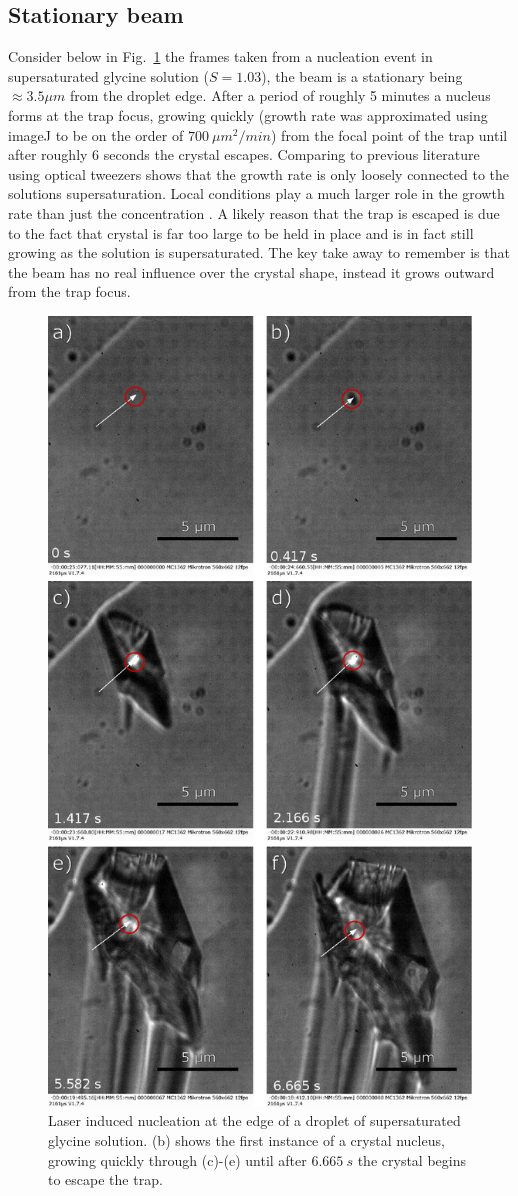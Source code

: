 \subsection{Stationary beam}
Consider below in Fig.~\ref{fig:stationary_beam} the frames taken from a nucleation 
event in supersaturated glycine solution ($S=1.03$), the beam is a stationary being 
$\approx3.5 \mu m$ from the droplet edge. After a period of roughly 5 minutes a 
nucleus forms at the trap focus, growing quickly (growth rate was approximated using
imageJ to be on the order of $700\ \mu m^2/min$) from the focal point of the trap 
until after roughly $6$ seconds the crystal escapes. Comparing to previous literature
using optical tweezers shows that the growth rate is only loosely connected to the 
solutions supersaturation. Local conditions play a much larger role in the growth 
rate than just the concentration \cite{Flannigan2023}. A likely reason that the trap 
is escaped is due to the fact that crystal is far too large to be held in place and 
is in fact still growing as the solution is supersaturated. The key take away to 
remember is that the beam has no real influence over the crystal shape, instead 
it grows outward from the trap focus.
\begin{figure}[h!]
	\centering
	\includegraphics[width=0.7\linewidth]{frames_no_beam_movement.pdf}
	\caption{Laser induced nucleation at the edge of a droplet of supersaturated 
	glycine solution. (b) shows the first instance of a crystal nucleus, growing 
	quickly through (c)-(e) until after $6.665\ s$ the crystal begins to escape the trap.}
	\label{fig:stationary_beam}
\end{figure}

